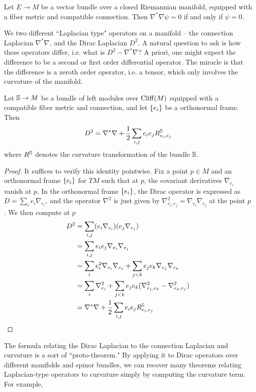 %
\begin{cor}
Let $E \to M$ be a vector bundle over a closed Riemannian manifold, equipped with
a fiber metric and compatible connection. Then $\nabla^*\nabla\psi = 0$ if and only
if $\psi = 0$.
\end{cor}
%
We two different ``Laplacian type" operators on a manifold -- the connection
Laplacian $\nabla^*\nabla$, and the Dirac Laplacian $D^2$. A natural question
to ask is how these operators differ, i.e. what is $D^2 - \nabla^*\nabla$? A priori,
one might expect the difference to be a second or first order differential operator.
The miracle is that the difference is a zeroth order operator, i.e. a tensor, which
only involves the curvature of the manifold.
%
\begin{thm}
Let $\S \to M$ be a bundle of left modules over $\Cliff(M)$ equipped with a compatible
fiber metric and connection, and let $\set{e_i}$ be a orthonormal frame. Then
\[
D^2 = \nabla^*\nabla + \frac{1}{2}\sum_{i, j} e_i e_j R^\S_{e_i, e_j}
\]
where $R^\S$ denotes the curvature transformation of the bundle $\S$.
\end{thm}
%
\begin{proof}
It suffices to verify this identity pointwise. Fix a point $p \in M$ and an orthonormal
frame $\set{e_i}$ for $TM$ such that at $p$, the covariant derivatives
$\nabla_{e_i}$ vanish at $p$. In the orthonormal frame $\set{e_i}$, the Dirac operator is
expressed as $D = \sum_i e_i\nabla_{e_i}$, and the operator $\nabla^2$ is just given
by $\nabla^2_{e_i,e_j} = \nabla_{e_i}\nabla_{e_j}$ at the point $p$. We then compute at
$p$
\begin{align*}
D^2 &= \sum_{i,j}(e_i\nabla_{e_i})(e_j\nabla_{e_j}) \\
&= \sum_{i,j} e_ie_j\nabla_{e_i}\nabla_{e_j} \\
&= \sum_i e_i^2\nabla_{e_i}\nabla_{e_j} + \sum_{j < k} e_j e_k\nabla_{e_j}\nabla_{e_k} \\
&= \sum_i \nabla^2_{e_i}
+ \sum_{j < k} e_je_k (\nabla^2_{e_j, e_k} - \nabla^2_{e_k, e_j}) \\
&= \nabla^*\nabla + \frac{1}{2}\sum_{i, j} e_i e_j R^\S_{e_i, e_j}
\end{align*}
\end{proof}
%
The formula relating the Dirac Laplacian to the connection Laplacian and curvature
is a sort of ``proto-theorem." By applying it to Dirac operators over different
manifolds and spinor bundles, we can recover many theorems relating Laplacian-type
operators to curvature simply by computing the curvature term. For example,
